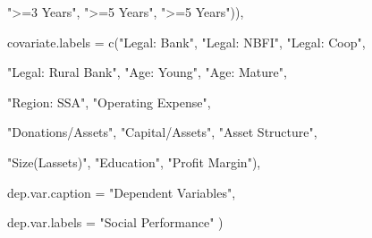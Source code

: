 \documentclass[a4paper,nobind]{templates/ociamthesis}
\newenvironment{Shaded}{\begin{snugshade}}{\end{snugshade}}
\newcommand{\AttributeTok}[1]{\textcolor[rgb]{0.77,0.63,0.00}{#1}}
\newcommand{\FunctionTok}[1]{\textcolor[rgb]{0.00,0.00,0.00}{#1}}
\newcommand{\NormalTok}[1]{#1}
\newcommand{\StringTok}[1]{\textcolor[rgb]{0.31,0.60,0.02}{#1}}
\renewenvironment{Shaded}
{
  \vspace{10pt}%
  \begin{snugshade}%
}{%
  \end{snugshade}%
  \vspace{8pt}%
}
\begin{document}
\begin{landscape}
\begin{Shaded}
\begin{Highlighting}[]
                   \StringTok{"\textgreater{}=3 Years"}\NormalTok{, }\StringTok{"\textgreater{}=5 Years"}\NormalTok{, }\StringTok{"\textgreater{}=5 Years"}\NormalTok{)),}

\AttributeTok{covariate.labels =} \FunctionTok{c}\NormalTok{(}\StringTok{"Legal: Bank"}\NormalTok{, }\StringTok{"Legal: NBFI"}\NormalTok{, }\StringTok{"Legal: Coop"}\NormalTok{, }
                     
                     \StringTok{"Legal: Rural Bank"}\NormalTok{, }\StringTok{"Age: Young"}\NormalTok{, }\StringTok{"Age: Mature"}\NormalTok{, }
                     
                     \StringTok{"Region: SSA"}\NormalTok{, }\StringTok{"Operating Expense"}\NormalTok{, }
                     
                     \StringTok{"Donations/Assets"}\NormalTok{, }\StringTok{"Capital/Assets"}\NormalTok{, }\StringTok{"Asset Structure"}\NormalTok{, }
                     
                     \StringTok{"Size(Lassets)"}\NormalTok{, }\StringTok{"Education"}\NormalTok{, }\StringTok{"Profit Margin"}\NormalTok{), }

\AttributeTok{dep.var.caption  =} \StringTok{"Dependent Variables"}\NormalTok{,}

  \AttributeTok{dep.var.labels   =} \StringTok{"Social Performance"}
\NormalTok{)}
\end{Highlighting}
\end{Shaded}


\end{landscape}
\end{document}
